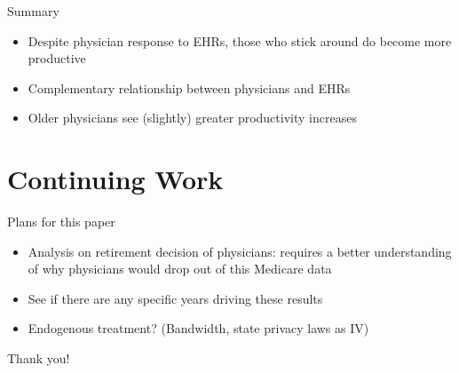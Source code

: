 \documentclass[10pt]{beamer}
\begin{document}
\begin{frame}{Summary}
\begin{itemize}
    \item Despite physician response to EHRs, those who stick around do become more productive
    \vspace{3mm}
    
    \item Complementary relationship between physicians and EHRs
    \vspace{3mm}
    
    \item Older physicians see (slightly) greater productivity increases 
    \vspace{3mm}
    
\end{itemize}
\end{frame}







\section{Continuing Work}

\begin{frame}{Plans for this paper}
    \begin{itemize}
        \item Analysis on retirement decision of physicians: requires a better understanding of why physicians would drop out of this Medicare data
        \item See if there are any specific years driving these results
        \item Endogenous treatment? (Bandwidth, state privacy laws as IV)
    \end{itemize}
\end{frame}

\begin{frame}[plain]{}
\centering
    Thank you!
\end{frame}
\end{document}
